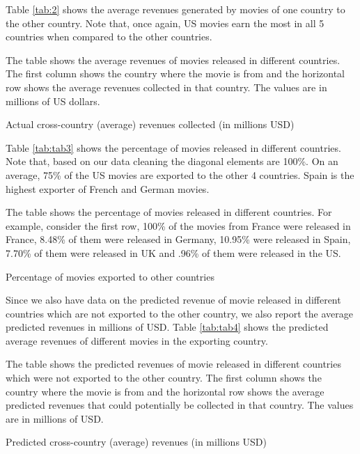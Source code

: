 \documentclass[11pt, letterpaper]{article} \usepackage{amsmath}
\newcommand{\floatintro}[1]{
  
  \vspace*{0.1in}
  
  {\footnotesize

    #1
    
  }
  
  \vspace*{0.1in} } \newcommand{\Hline}{\noindent\rule{18cm}{0.5pt}}
\begin{document}
Table \ref{tab:2} shows the average revenues generated by movies of
one country to the other country. Note that, once again, US movies
earn the most in all 5 countries when compared to the other countries.
\begin{table}[htbp!]
  \floatintro{The table shows the average revenues of movies released
    in different countries. The first column shows the country where
    the movie is from and the horizontal row shows the average
    revenues collected in that country. The values are in millions of
    US dollars.}
  \centering
  
  \caption{Actual cross-country (average) revenues collected (in millions USD)}
  \label{tab:2}
\end{table}
Table \ref{tab:tab3} shows the percentage of movies released in
different countries. Note that, based on our data cleaning the
diagonal elements are 100\%. On an average, 75\% of the US movies are
exported to the other 4 countries. Spain is the highest exporter of
French and German movies.
\begin{table}[htbp!]
  \floatintro{The table shows the percentage of movies released in
    different countries. For example, consider the first row, 100\% of
    the movies from France were released in France, 8.48\% of them
    were released in Germany, 10.95\% were released in Spain, 7.70\%
    of them were released in UK and .96\% of them were released in the
    US.}
  \centering
  
  \caption{Percentage of movies exported to other countries}
  \label{tab:tab3}
\end{table}
Since we also have data on the predicted revenue of movie released in
different countries which are not exported to the other country, we
also report the average predicted revenues in millions of USD. Table
\ref{tab:tab4} shows the predicted average revenues of different
movies in the exporting country.
\begin{table}[htbp!]
  \floatintro{The table shows the predicted revenues of movie released
    in different countries which were not exported to the other
    country. The first column shows the country where the movie is from
    and the horizontal row shows the average predicted revenues that
    could potentially be collected in that country. The values are in
    millions of USD.}
  \centering
  
  \caption{Predicted cross-country (average) revenues (in millions USD)}
  \label{tab:tab4}
\end{table}
\end{document}

